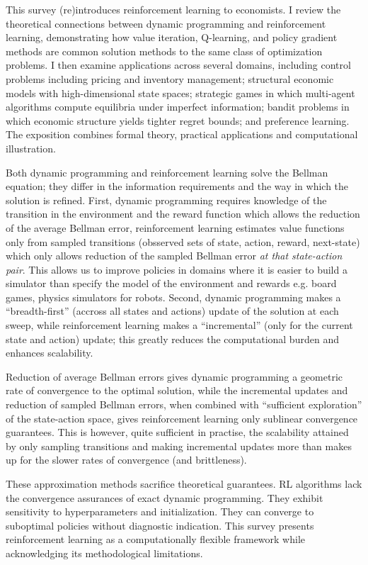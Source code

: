 This survey (re)introduces reinforcement learning to economists. I review the theoretical connections between dynamic programming and reinforcement learning, demonstrating how value iteration, Q-learning, and policy gradient methods are common solution methods to the same class of optimization problems. I then examine applications across several domains, including control problems including pricing and inventory management; structural economic models with high-dimensional state spaces; strategic games in which multi-agent algorithms compute equilibria under imperfect information; bandit problems in which economic structure yields tighter regret bounds; and preference learning. The exposition combines formal theory, practical applications and computational illustration.

Both dynamic programming and reinforcement learning solve the Bellman equation; they differ in the information requirements and the way in which the solution is refined. First, dynamic programming requires knowledge of the transition in the environment and the reward function which allows the reduction of the average Bellman error, reinforcement learning estimates value functions only from sampled transitions (obsserved sets of state, action, reward, next-state) which only allows reduction of the sampled Bellman error \textit{at that state-action pair}. This allows us to improve policies in domains where it is easier to build a simulator than specify the model of the environment and rewards e.g. board games, physics simulators for robots. Second, dynamic programming makes a ``breadth-first'' (accross all states and actions) update of the solution at each sweep, while reinforcement learning makes a ``incremental'' (only for the current state and action) update; this greatly reduces the computational burden and enhances scalability. 

Reduction of average Bellman errors gives dynamic programming a geometric rate of convergence to the optimal solution, while the incremental updates and reduction of sampled Bellman errors, when combined with ``sufficient exploration'' of the state-action space, gives reinforcement learning only sublinear convergence guarantees. This is however, quite sufficient in practise, the scalability attained by only sampling transitions and making incremental updates more than makes up for the slower rates of convergence (and brittleness). 

These approximation methods sacrifice theoretical guarantees. RL algorithms lack the convergence assurances of exact dynamic programming. They exhibit sensitivity to hyperparameters and initialization. They can converge to suboptimal policies without diagnostic indication. This survey presents reinforcement learning as a computationally flexible framework while acknowledging its methodological limitations.

